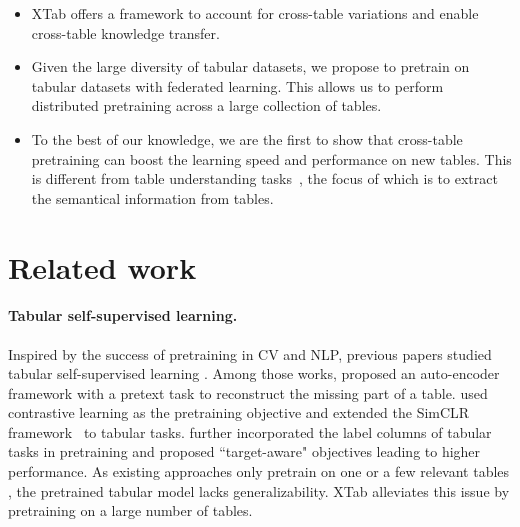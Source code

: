 \begin{itemize} 
\itemsep-0.3em 
\item XTab offers a framework to account for cross-table variations and enable cross-table knowledge transfer. 
\item Given the large diversity of tabular datasets, we propose to pretrain on tabular datasets with federated learning. This allows us to perform distributed pretraining across a large collection of tables. 
\item To the best of our knowledge, we are the first to show that cross-table pretraining can boost the learning speed and performance on new tables. This is different from table understanding tasks~\cite{yin2020tabert},  the focus of which is to extract the semantical information from tables.

\end{itemize}

\section{Related work} \label{related_work} 
\paragraph{Tabular self-supervised learning.} Inspired by the success of pretraining in CV and NLP, previous papers studied tabular self-supervised learning \citep{yoon2020vime, ucar2021subtab, somepalli2021saint, bahri2021scarf, majmundar2022met, rubachev2022revisiting, wang2022transtab}. Among those works, \citet{yoon2020vime, ucar2021subtab} proposed an auto-encoder framework with a pretext task to reconstruct the missing part of a table. \citet{bahri2021scarf} used contrastive learning as the pretraining objective and extended the SimCLR framework~\citep{chen2020simple} to tabular tasks. \citet{rubachev2022revisiting, wang2022transtab} further incorporated the label columns of tabular tasks in pretraining and proposed ``target-aware" objectives leading to higher performance. As existing approaches only pretrain on one \citep{bahri2021scarf,ucar2021subtab} or a few relevant tables \citep{wang2022transtab}, the pretrained tabular model lacks generalizability. XTab alleviates this issue by pretraining on a large number of tables. 

